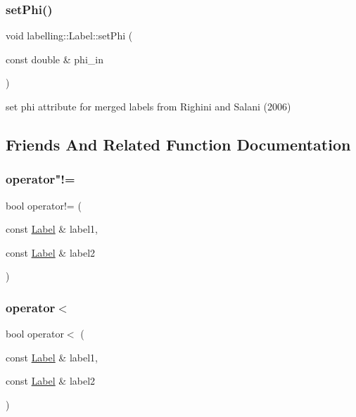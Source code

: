 \subsubsection{\texorpdfstring{set\+Phi()}{setPhi()}}
{\footnotesize\ttfamily void labelling\+::\+Label\+::set\+Phi (\begin{DoxyParamCaption}\item[{const double \&}]{phi\+\_\+in }\end{DoxyParamCaption})\hspace{0.3cm}{\ttfamily [inline]}}



set phi attribute for merged labels from Righini and Salani (2006) 



\subsection{Friends And Related Function Documentation}
\mbox{\label{classlabelling_1_1Label_a48813c4c8ca8174edcdf9cf34358b442}} 
\subsubsection{\texorpdfstring{operator"!=}{operator!=}}
{\footnotesize\ttfamily bool operator!= (\begin{DoxyParamCaption}\item[{const \hyperlink{classlabelling_1_1Label}{Label} \&}]{label1,  }\item[{const \hyperlink{classlabelling_1_1Label}{Label} \&}]{label2 }\end{DoxyParamCaption})\hspace{0.3cm}{\ttfamily [friend]}}

\mbox{\label{classlabelling_1_1Label_aac0781be66b1d133b633cef3f60f8183}} 
\subsubsection{\texorpdfstring{operator$<$}{operator<}}
{\footnotesize\ttfamily bool operator$<$ (\begin{DoxyParamCaption}\item[{const \hyperlink{classlabelling_1_1Label}{Label} \&}]{label1,  }\item[{const \hyperlink{classlabelling_1_1Label}{Label} \&}]{label2 }\end{DoxyParamCaption})\hspace{0.3cm}{\ttfamily [friend]}}

